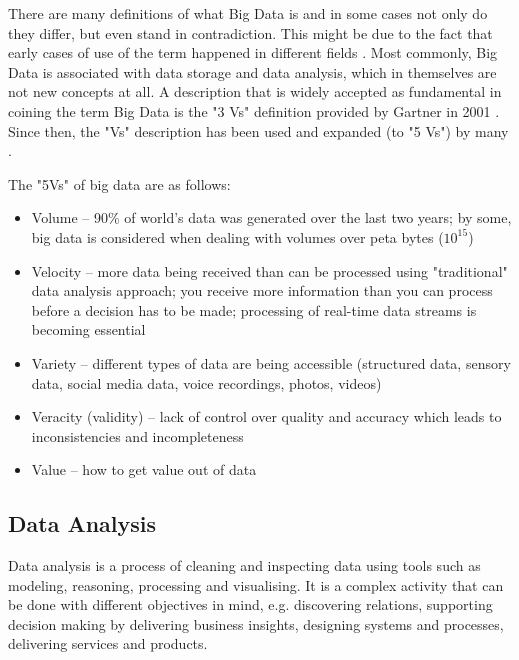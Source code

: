 There are many definitions of what Big Data is and in some cases not only do they differ, but even stand in contradiction. This might be due to the fact that early cases of use of the term happened in different fields \citep{demchenko2014defining, Ward2013}. Most commonly, Big Data is associated with data storage and data analysis, which in themselves are not new concepts at all. A description that is widely accepted as fundamental in coining the term Big Data is the "3 Vs" definition provided by Gartner in 2001 \citep{douglas20013d, Ward2013}. Since then, the "Vs" description has been used and expanded (to "5 Vs") by many \citep{McAfee2012, minelli2012big, demchenko2014defining, NIST2015}.

The "5Vs" of big data are as follows:
\begin{itemize}
\item Volume – 90\% of world's data was generated over the last two years; by some, big data is considered when dealing with volumes over peta bytes ($10^{15}$)

\item Velocity – more data being received than can be processed using "traditional" data analysis approach; you receive more information than you can process before a decision has to be made; processing of real-time data streams is becoming essential

\item Variety – different types of data are being accessible (structured data, sensory data, social media data, voice recordings, photos, videos)

\item Veracity (validity) – lack of control over quality and accuracy which leads to inconsistencies and incompleteness

\item Value – how to get value out of data
\end{itemize}

		\subsection{Data Analysis}
		
Data analysis is a process of cleaning and inspecting data using tools such as modeling, reasoning, processing and visualising. It is a complex activity that can be done with different objectives in mind, e.g. discovering relations, supporting decision making by delivering business insights, designing systems and processes, delivering services and products.

